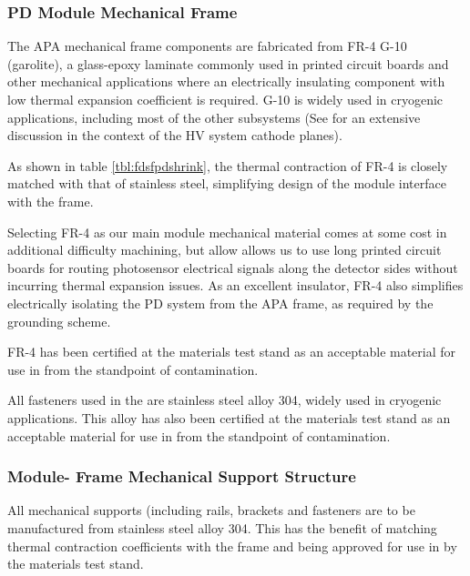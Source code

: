 \subsubsection{PD Module Mechanical Frame}

The APA mechanical frame components are fabricated from FR-4 G-10 (garolite), a glass-epoxy laminate commonly used in printed circuit boards and other mechanical applications where an electrically insulating component with low thermal expansion coefficient is required.  G-10 is widely used in cryogenic applications, including most of the other  subsystems (See  for an extensive discussion in the context of the HV system cathode planes). 

As shown in table \ref{tbl:fdsfpdshrink}, the thermal contraction of FR-4 is closely matched with that of stainless steel, simplifying design of the module interface with the  frame.

Selecting FR-4 as our main module mechanical material comes at some cost in additional difficulty machining, but allow  allows us to use long printed circuit boards for routing photosensor electrical signals along the detector sides without incurring thermal expansion issues.  As an excellent insulator, FR-4 also simplifies electrically isolating the PD system from the APA frame, as required by the  grounding scheme.

FR-4 has been certified at the  materials test stand as an acceptable material for use in  from the standpoint of  contamination.

All fasteners used in the  are stainless steel alloy 304, widely used in cryogenic applications.  This alloy has also been certified at the  materials test stand as an acceptable material for use in  from the standpoint of  contamination.

\subsubsection{ Module- Frame Mechanical Support Structure}

All  mechanical supports (including rails, brackets and fasteners are to be manufactured from stainless steel alloy 304.  This has the benefit of matching thermal contraction coefficients with the  frame and being approved for use in  by the materials test stand.

